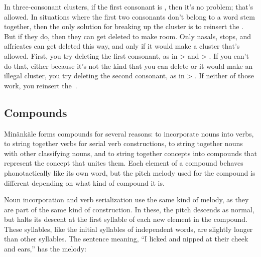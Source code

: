 In three-consonant clusters, if the first consonant is , then
it's no problem; that's allowed. In situations where the first two consonants
don't belong to a word stem together, then the only solution for breaking up the
cluster is to reinsert the . But if they do, then they can get deleted to
make room. Only nasals, stops, and affricates can get deleted this way, and only
if it would make a cluster that's allowed. First, you try deleting the first
consonant, as in  >  and  >
. If you can't do that, either because it's not the kind that you
can delete or it would make an illegal cluster, you try deleting the second
consonant, as in  > . If neither of those work, you
reinsert the~.

\subsection{Compounds}\label{s:compounds}
Min\"ank\"ale forms compounds for several reasons: to incorporate nouns
into verbs, to string together verbs for serial verb constructions, to string
together nouns with other classifying nouns, and to string together concepts
into compounds that represent the concept that unites them. Each element of a
compound behaves phonotactically like its own word, but the pitch melody used
for the compound is different depending on what kind of compound it is.

Noun incorporation and verb serialization use the same kind of melody, as they
are part of the same kind of construction. In these, the pitch descends as
normal, but halts its descent at the first syllable of each new element in the
compound. These syllables, like the initial syllables of independent words, are
slightly longer than other syllables. The sentence
 meaning, ``I licked and nipped at their
cheek and ears,'' has the melody:

